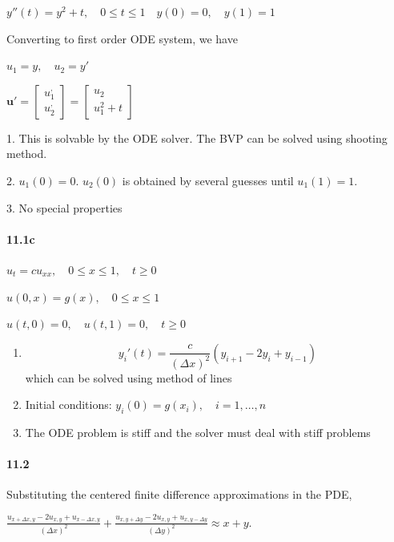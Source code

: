\documentclass[a4paper, 11pt]{article}
\begin{document}
	$y''(t)=y^{2}+t,\quad0\le t\le1\quad y(0)=0,\quad y(1)=1$
	
	Converting to first order ODE system, we have
	
	$u_{1}=y,\quad u_{2}=y'$
	
	$\mathbf{u}'=\left[\begin{array}{c}
	u_{1}^{,}\\
	u_{2}^{,}
	\end{array}\right]=\left[\begin{array}{c}
	u_{2}\\
	u_{1}^{2}+t
	\end{array}\right]$
	
	1. This is solvable by the ODE solver. The BVP can be solved using
	shooting method.
	
	2. $u_{1}(0)=0$. $u_{2}(0)$ is obtained by several guesses until
	$u_{1}(1)=1$.
	
	3. No special properties
	
	
	\paragraph{11.1c}
	$u_{t}=cu_{xx},\quad0\le x\le1,\quad t\ge0$
	
	$u(0,x)=g(x),\quad0\le x\le1$
	
	$u(t,0)=0,\quad u(t,1)=0,\quad t\ge0$
	
	\begin{enumerate}
		\item \begin{equation*}
		y_{i}'(t) = \frac{c}{(\Delta x)^2} (y_{i+1} - 2y_{i} + y_{i-1})
		\end{equation*}
		which can be solved using method of lines
		\item Initial conditions: $y_{i}(0)=g(x_{i}),\quad i=1,\ldots,n$
		\item The ODE problem is stiff and the solver must deal with stiff problems
	\end{enumerate}
	
	
	\paragraph{11.2}
	
	Substituting the centered finite difference approximations in the
	PDE,
	
	$\frac{u_{x+\Delta x,y}-2u_{x,y}+u_{x-\Delta x,y}}{(\Delta x)^{2}}+\frac{u_{x,y+\Delta y}-2u_{x,y}+u_{x,y-\Delta y}}{(\Delta y)^{2}}\approx x+y$.
	
\end{document}
